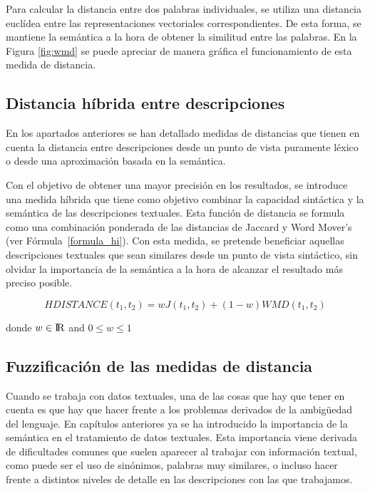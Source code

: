 Para calcular la distancia entre dos palabras individuales, se utiliza una distancia euclídea entre las representaciones vectoriales correspondientes. De esta forma, se mantiene la semántica a la hora de obtener la similitud entre las palabras. En la Figura \ref{fig:wmd} se puede apreciar de manera gráfica el funcionamiento de esta medida de distancia. 

    
\subsection{Distancia híbrida entre descripciones}

En los apartados anteriores se han detallado medidas de distancias que tienen en cuenta la distancia entre descripciones desde un punto de vista puramente léxico o desde una aproximación basada en la semántica. 

Con el objetivo de obtener una mayor precisión en los resultados, se introduce una medida híbrida que tiene como objetivo combinar la capacidad sintáctica y la semántica de las descripciones textuales. Esta función de distancia se formula como una combinación ponderada de las distancias de Jaccard y Word Mover's (ver Fórmula~\ref{formula_hi}). Con esta medida, se pretende beneficiar aquellas descripciones textuales que sean similares desde un punto de vista sintáctico, sin olvidar la importancia de la semántica a la hora de alcanzar el resultado más preciso posible. 

    \begin{equation}
        HDISTANCE(t_{1},t_{2})=wJ(t_{1},t_{2}) + (1-w)WMD(t_{1},t_{2})
     \end{equation}
    \begin{center}
    donde $w\in {\rm I\!R}$ and $0 \leq w \leq 1$
    \end{center}\label{formula_hi}


\subsection{Fuzzificación de las medidas de distancia }
Cuando se trabaja con datos textuales, una de las cosas que hay que tener en cuenta es que hay que hacer frente a los problemas derivados de la ambigüedad del lenguaje. En capítulos anteriores ya se ha introducido la importancia de la semántica en el tratamiento de datos textuales. Esta importancia viene derivada de dificultades comunes que suelen aparecer al trabajar con información textual, como puede ser el uso de sinónimos, palabras muy similares, o incluso hacer frente a distintos niveles de detalle en las descripciones con las que trabajamos. 

